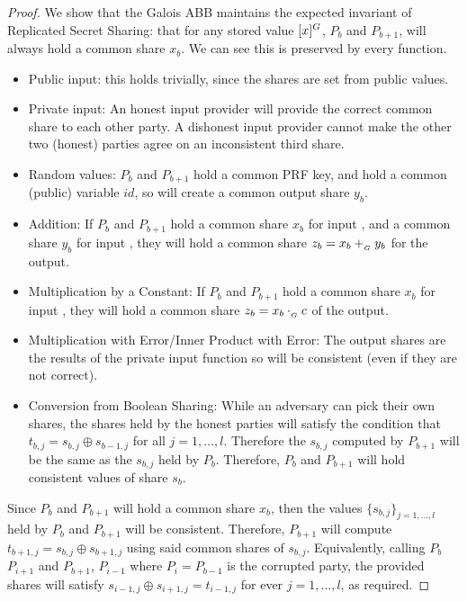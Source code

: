 \begin{proof}
	We show that the Galois ABB maintains the expected invariant 
	of Replicated Secret Sharing:
	that for any stored value $[x]^{G}$,
	$P_b$ and $P_{b+1}$, will always hold a common share $x_b$.
	We can see this is preserved by every function. 
	\begin{itemize}
		\item Public input: this holds trivially, since the shares are set 
		from public values.
		\item Private input: An honest input provider will provide
		the correct common share to each other party.
			A dishonest input provider cannot make the other two (honest) parties 
			agree on an inconsistent third share.
		\item Random values: $P_b$ and $P_{b+1}$ hold a common PRF key,
			and hold a common (public) variable $id$,
			so will create a common output share $y_b$.
		\item Addition: If $P_b$ and $P_{b+1}$ hold a common share
			$x_b$ for input ,
			and a common share $y_b$ for input ,
			they will hold a common share $z_b = x_b +_{_G} y_b$
			for the output. 
		\item Multiplication by a Constant:
			If $P_b$ and $P_{b+1}$ hold a common share
			$x_b$ for input ,
			they will hold a common share $z_b = x_b \cdot_{_G} c$ of the output.
		\item Multiplication with Error/Inner Product with Error:
			The output shares are the results of the private input function
			so will be consistent (even if they are not correct).
		\item Conversion from Boolean Sharing:
			While an adversary can pick their own shares,
			the shares held by the honest parties will satisfy the condition
			that $t_{b,j} = s_{b,j} \oplus s_{b-1,j}$ for all $j=1,\ldots,l$.
			Therefore the $s_{b,j}$ computed by $P_{b+1}$ will be the same
			as the $s_{b,j}$ held by $P_{b}$.
			Therefore, $P_b$ and $P_{b+1}$ will hold consistent values of share $s_b$.
		\end{itemize}
	Since $P_b$ and $P_{b+1}$ will hold a common share $x_b$,
	then the values $\{s_{b,j}\}_{j=1,\ldots,l}$ held by $P_b$ and $P_{b+1}$ will be consistent.
	Therefore, $P_{b+1}$ will compute $t_{b+1,j} = s_{b,j} \oplus s_{b+1,j}$
	using said common shares of $s_{b, j}$.
	Equivalently, calling $P_b$ $P_{i+1}$ and $P_{b+1}$, $P_{i-1}$
	where $P_i = P_{b-1}$ is the corrupted party,
	the provided shares will satisfy $s_{i-1,j} \oplus s_{i+1,j} = t_{i-1,j}$ 
	for ever $j=1,\ldots,l$, as required.
\end{proof}


